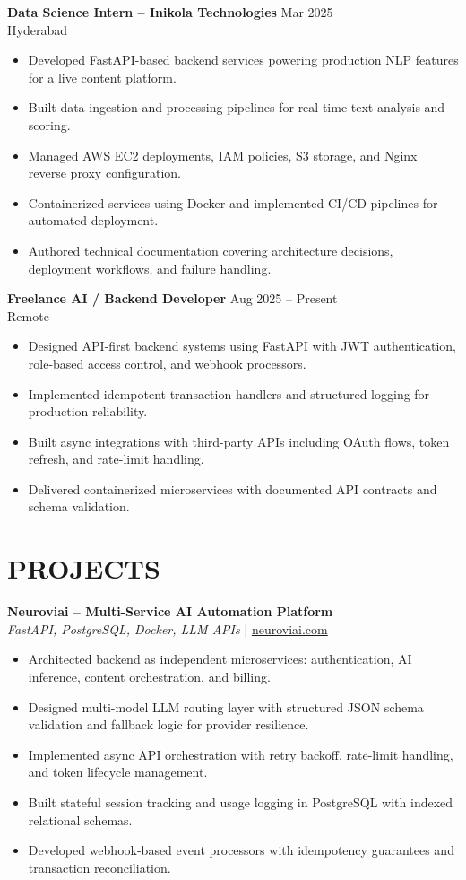 \documentclass[10pt]{article}
\begin{document}
\textbf{Data Science Intern -- Inikola Technologies} \hfill Mar 2025 \\
Hyderabad
\begin{itemize}
\item Developed FastAPI-based backend services powering production NLP features for a live content platform.
\item Built data ingestion and processing pipelines for real-time text analysis and scoring.
\item Managed AWS EC2 deployments, IAM policies, S3 storage, and Nginx reverse proxy configuration.
\item Containerized services using Docker and implemented CI/CD pipelines for automated deployment.
\item Authored technical documentation covering architecture decisions, deployment workflows, and failure handling.
\end{itemize}

\textbf{Freelance AI / Backend Developer} \hfill Aug 2025 -- Present \\
Remote
\begin{itemize}
\item Designed API-first backend systems using FastAPI with JWT authentication, role-based access control, and webhook processors.
\item Implemented idempotent transaction handlers and structured logging for production reliability.
\item Built async integrations with third-party APIs including OAuth flows, token refresh, and rate-limit handling.
\item Delivered containerized microservices with documented API contracts and schema validation.
\end{itemize}

\section*{PROJECTS}

\textbf{Neuroviai -- Multi-Service AI Automation Platform} \\
\textit{FastAPI, PostgreSQL, Docker, LLM APIs} \;|\;
\href{https://neuroviai.com}{neuroviai.com}
\begin{itemize}
\item Architected backend as independent microservices: authentication, AI inference, content orchestration, and billing.
\item Designed multi-model LLM routing layer with structured JSON schema validation and fallback logic for provider resilience.
\item Implemented async API orchestration with retry backoff, rate-limit handling, and token lifecycle management.
\item Built stateful session tracking and usage logging in PostgreSQL with indexed relational schemas.
\item Developed webhook-based event processors with idempotency guarantees and transaction reconciliation.
\end{itemize}
\end{document}

